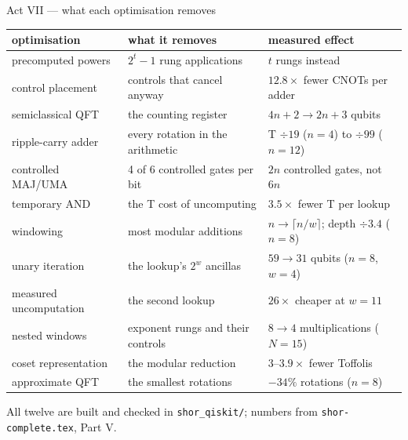 \documentclass[aspectratio=169,11pt]{beamer}
\begin{document}
\setcounter{framenumber}{39}
\begin{frame}{Act VII --- what each optimisation removes}
  \centering\footnotesize
  \renewcommand{\arraystretch}{1.06}
  \begin{tabular}{@{}lll@{}}
    \toprule
    optimisation & what it removes & measured effect \\
    \midrule
    precomputed powers & $2^t-1$ rung applications & $t$ rungs instead \\
    control placement & controls that cancel anyway & $12.8\times$ fewer CNOTs per adder \\
    semiclassical QFT & the counting register & $4n+2\to2n+3$ qubits \\
    ripple-carry adder & every rotation in the arithmetic & T $\div19$ ($n=4$) to $\div99$ ($n=12$) \\
    controlled MAJ/UMA & 4 of 6 controlled gates per bit & $2n$ controlled gates, not $6n$ \\
    temporary AND & the T cost of uncomputing & $3.5\times$ fewer T per lookup \\
    windowing & most modular additions & $n\to\lceil n/w\rceil$; depth $\div3.4$ ($n=8$) \\
    unary iteration & the lookup's $2^w$ ancillas & $59\to31$ qubits ($n=8$, $w=4$) \\
    measured uncomputation & the second lookup & $26\times$ cheaper at $w=11$ \\
    nested windows & exponent rungs and their controls & $8\to4$ multiplications ($N=15$) \\
    coset representation & the modular reduction & $3$--$3.9\times$ fewer Toffolis \\
    approximate QFT & the smallest rotations & $-34\%$ rotations ($n=8$) \\
    \bottomrule
  \end{tabular}
  \begin{takeaway}All twelve are built and checked in \texttt{shor\_qiskit/}; numbers from \texttt{shor-complete.tex}, Part V.\end{takeaway}
\end{frame}
\end{document}
